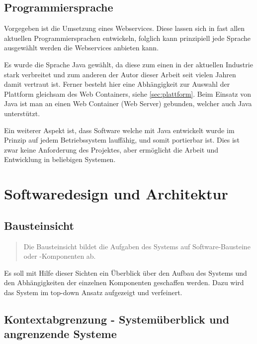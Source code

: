 
\subsection{Programmiersprache}
Vorgegeben ist die Umsetzung eines \glspl{Webservice}. Diese lassen sich in fast allen aktuellen Programmiersprachen entwickeln, folglich kann prinzipiell jede Sprache ausgewählt werden die Webservices anbieten kann.  

Es wurde die Sprache Java gewählt, da diese zum einen in der aktuellen Industrie stark verbreitet und zum anderen der Autor dieser Arbeit seit vielen Jahren damit vertraut ist. Ferner besteht hier eine Abhängigkeit zur Auswahl der Plattform gleichsam des Web Containers, siehe \autoref{sec:plattform}. Beim Einsatz von Java ist man an einen Web Container (Web Server) gebunden, welcher auch Java unterstützt. 

Ein weiterer Aspekt ist, dass Software welche mit Java entwickelt wurde im Prinzip auf jedem Betriebssystem lauffähig, und somit portierbar ist. Dies ist zwar keine Anforderung des Projektes, aber ermöglicht die Arbeit und Entwicklung in beliebigen Systemen. 

\section{Softwaredesign und Architektur}

\subsection{Bausteinsicht}
\begin{quotation}
Die Bausteinsicht bildet die Aufgaben des Systems auf Software-Bausteine oder -Komponenten ab.
 \citep[S. 98ff][]{starke}	
\end{quotation}

Es soll mit Hilfe dieser Sichten ein Überblick über den Aufbau des Systems und den Abhängigkeiten der einzelnen Komponenten geschaffen werden. Dazu wird das System im top-down Ansatz aufgezeigt und verfeinert. 

\subsection{Kontextabgrenzung - Systemüberblick und angrenzende Systeme}

